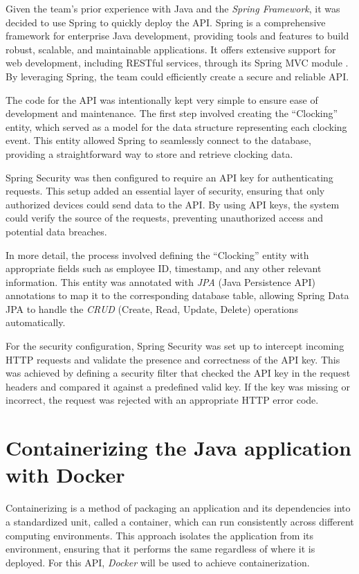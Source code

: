 Given the team's prior experience with Java and the \textit{Spring Framework}, it was decided to 
use Spring to quickly deploy the API. Spring is a comprehensive framework for enterprise Java 
development, providing tools and features to build robust, scalable, and maintainable 
applications. It offers extensive support for web development, including RESTful services, through 
its Spring MVC module \cite{spring_docs}. By leveraging Spring, the team could efficiently create 
a secure and reliable API.

The code for the API was intentionally kept very simple to ensure ease of development and 
maintenance. The first step involved creating the ``Clocking'' entity, which served as a model for 
the data structure representing each clocking event. This entity allowed Spring to seamlessly 
connect to the database, providing a straightforward way to store and retrieve clocking data.

Spring Security was then configured to require an API key for authenticating requests. This setup 
added an essential layer of security, ensuring that only authorized devices could send data to 
the API. By using API keys, the system could verify the source of the requests, preventing 
unauthorized access and potential data breaches.

In more detail, the process involved defining the ``Clocking'' entity with appropriate fields such 
as employee ID, timestamp, and any other relevant information. This entity was annotated with 
\textit{JPA} (Java Persistence API) annotations to map it to the corresponding database table, 
allowing Spring Data JPA to handle the \textit{CRUD} (Create, Read, Update, Delete) operations 
automatically.

For the security configuration, Spring Security was set up to intercept incoming HTTP requests and 
validate the presence and correctness of the API key. This was achieved by defining a security 
filter that checked the API key in the request headers and compared it against a predefined valid 
key. If the key was missing or incorrect, the request was rejected with an appropriate HTTP error 
code.


\section{Containerizing the Java application with Docker}

Containerizing is a method of packaging an application and its dependencies into a standardized 
unit, called a container, which can run consistently across different computing environments. 
This approach isolates the application from its environment, ensuring that it performs the same 
regardless of where it is deployed. For this API, \textit{Docker} will be used to achieve 
containerization.

